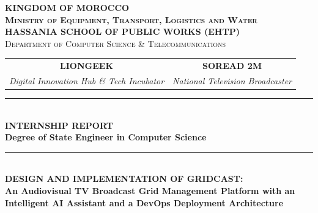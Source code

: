 \documentclass[12pt,a4paper,oneside]{report}
\begin{document}
\begin{titlepage}

\centering
\vspace*{-0.5cm}

{\scshape\bfseries\large KINGDOM OF MOROCCO}\\[0.2cm]
{\scshape\bfseries\normalsize Ministry of Equipment, Transport, Logistics and Water}\\[0.2cm]
{\scshape\bfseries\large HASSANIA SCHOOL OF PUBLIC WORKS (EHTP)}\\[0.2cm]
{\scshape\normalsize Department of Computer Science \& Telecommunications}\\[0.6cm]

\begin{center}
    \begin{tabular}{cc}
        \textbf{\large LIONGEEK} & \textbf{\large SOREAD 2M} \\
        \textit{\small Digital Innovation Hub \& Tech Incubator} & \textit{\small National Television Broadcaster}
    \end{tabular}
\end{center}

\vspace{0.8cm}
{\color{accentorange}\rule{0.85\textwidth}{2pt}}\\[0.4cm]
{\LARGE\bfseries\color{primaryblue} INTERNSHIP REPORT}\\[0.3cm]
{\large\bfseries Degree of State Engineer in Computer Science}\\[0.4cm]
{\color{accentorange}\rule{0.85\textwidth}{2pt}}\\[0.8cm]

{\LARGE\bfseries\color{primaryblue} DESIGN AND IMPLEMENTATION OF GRIDCAST:}\\[0.3cm]
{\Large\bfseries An Audiovisual TV Broadcast Grid Management Platform with an Intelligent AI Assistant and a DevOps Deployment Architecture}\\[1.0cm]


\end{titlepage}
\end{document}
